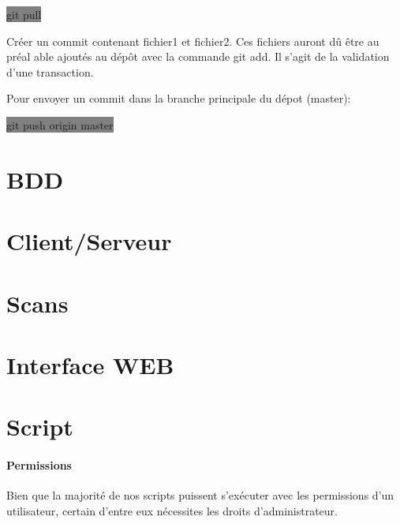 \documentclass[11pt,a4paper,titlepage, oneside]{article}
\begin{document}
			\colorbox{gray}{git pull}

			Créer un commit contenant fichier1 et fichier2. Ces fichiers auront dû être au préal able ajoutés au dépôt avec la commande git add. Il s'agit de la validation d'une transaction. 

			Pour envoyer un commit dans la branche principale du dépot (master):
			
			\colorbox{gray}{git push origin master}	

\newpage
\section{{\color{red} BDD}}
	\paragraph{}
\newpage
\section{{\color{red} Client/Serveur}}

\newpage
\section{{\color{red} Scans}}

\newpage
\section{{\color{red} Interface WEB}}

\newpage
\section{{\color{red} Script }}
	\paragraph{Permissions}
		Bien que la majorité de nos scripts puissent s'exécuter avec les permissions d'un utilisateur, certain d'entre eux nécessites les droits d'administrateur.\\
\end{document}
